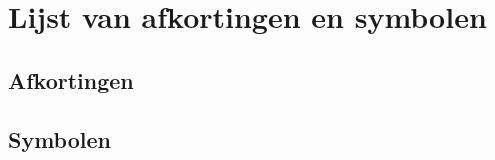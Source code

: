 \documentclass[draft,master=cws,masteroption=ai]{kulemt}
\begin{document}
\listoffigures
\begingroup
\let\clearpage\relax
\listoftables
\begingroup
\let\clearpage\relax
\listofalgorithms
\endgroup
\endgroup
\chapter{Lijst van afkortingen en symbolen}
\section*{Afkortingen}

\section*{Symbolen}


\mainmatter






%


\appendixpage*          %
\appendix





\backmatter
\begin{multicols}{2}


\end{multicols}
\end{document}
